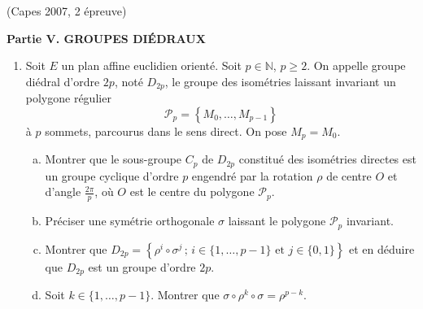 \documentclass[a4paper,11pt,reqno]{amsart}
\begin{document}
\begin{exo} (Capes 2007, 2\ieme{} épreuve)

  \begin{center}
    \textbf{Partie V. GROUPES DIÉDRAUX}
  \end{center}
  \begin{enumerate}[\textbf{1)}]
    \item Soit $E$ un plan affine euclidien orienté. Soit $p \in \mathbb{N}$, $p \geq 2$. On appelle groupe diédral d'ordre $2p$, noté $D_{2p}$, le groupe des isométries laissant invariant un polygone régulier
    \[
      \mathcal{P}_{p}=\left\{M_{0},\ldots,M_{p-1}\right\}
    \]
    à $p$ sommets, parcourus dans le sens direct. On pose $M_{p}=M_{0}$.
    \begin{enumerate}[a)]
      \item Montrer que le sous-groupe $C_{p}$ de $D_{2p}$ constitué des isométries directes est un groupe cyclique d'ordre $p$ engendré par la rotation $\rho$ de centre $O$ et d'angle $\frac{2 \pi}{p}$, où $O$ est le centre du polygone $\mathcal{P}_{p}$.
      \item Préciser une symétrie orthogonale $\sigma$ laissant le polygone $\mathcal{P}_{p}$ invariant.
      \item Montrer que
      $
        D_{2p} =
          \left\{
            \rho^{i}\circ \sigma^{j} \,;\, i \in \{1,\ldots,p-1\} \text{ et } j \in \{0,1\}
          \right\}
      $
      et en déduire que $D_{2p}$ est un groupe d'ordre $2p$.
      \item Soit $k \in \{1,\ldots,p-1\}$. Montrer que $\sigma \circ \rho^{k} \circ \sigma = \rho^{p-k}$.
    \end{enumerate}
  \end{enumerate}
\end{exo}
\end{document}
